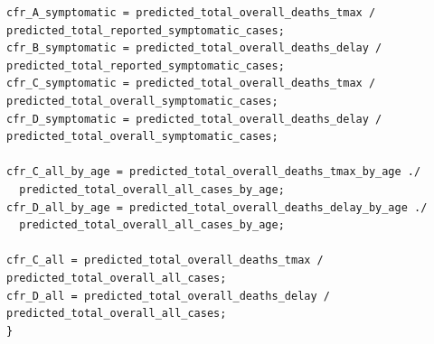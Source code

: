 \documentclass{article}
\begin{document}
\begin{verbatim}
cfr_A_symptomatic = predicted_total_overall_deaths_tmax / predicted_total_reported_symptomatic_cases;
cfr_B_symptomatic = predicted_total_overall_deaths_delay / predicted_total_reported_symptomatic_cases;
cfr_C_symptomatic = predicted_total_overall_deaths_tmax / predicted_total_overall_symptomatic_cases;
cfr_D_symptomatic = predicted_total_overall_deaths_delay / predicted_total_overall_symptomatic_cases;

cfr_C_all_by_age = predicted_total_overall_deaths_tmax_by_age ./ 
  predicted_total_overall_all_cases_by_age;
cfr_D_all_by_age = predicted_total_overall_deaths_delay_by_age ./ 
  predicted_total_overall_all_cases_by_age;

cfr_C_all = predicted_total_overall_deaths_tmax / predicted_total_overall_all_cases;
cfr_D_all = predicted_total_overall_deaths_delay / predicted_total_overall_all_cases;
}

\end{verbatim}

 


	
\end{document}
